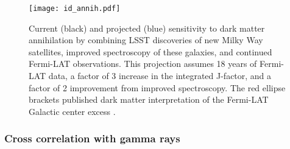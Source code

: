 \begin{figure}
\centering
\texttt{[image: id\_annih.pdf]}
\caption{Current (black) and projected (blue) sensitivity to dark matter annihilation by combining LSST discoveries of new Milky Way satellites, improved spectroscopy of these galaxies, and continued Fermi-LAT observations. This projection assumes 18 years of Fermi-LAT data, a factor of 3 increase in the integrated J-factor, and a factor of 2 improvement from improved spectroscopy. The red ellipse brackets published dark matter interpretation of the Fermi-LAT Galactic center excess \citep[\ie,][]{Daylan:2017kfh, Gordon:2013, Abazajian:2014}.
\label{fig:indirect}
}
\end{figure}

\subsubsection{Cross correlation with gamma rays }


